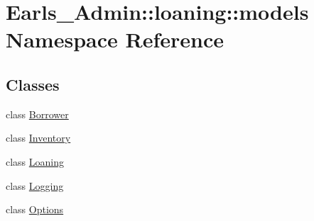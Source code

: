\hypertarget{namespaceEarls__Admin_1_1loaning_1_1models}{
\section{Earls\_\-Admin::loaning::models Namespace Reference}
\label{namespaceEarls__Admin_1_1loaning_1_1models}
}


\subsection*{Classes}
\begin{CompactItemize}
\item 
class \hyperlink{classEarls__Admin_1_1loaning_1_1models_1_1Borrower}{Borrower}
\item 
class \hyperlink{classEarls__Admin_1_1loaning_1_1models_1_1Inventory}{Inventory}
\item 
class \hyperlink{classEarls__Admin_1_1loaning_1_1models_1_1Loaning}{Loaning}
\item 
class \hyperlink{classEarls__Admin_1_1loaning_1_1models_1_1Logging}{Logging}
\item 
class \hyperlink{classEarls__Admin_1_1loaning_1_1models_1_1Options}{Options}
\end{CompactItemize}
